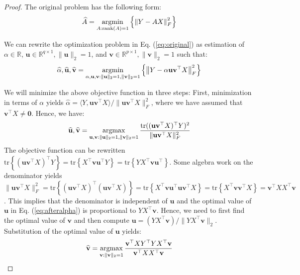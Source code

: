 \begin{proof}

The original problem has the following form:
\begin{equation}
\widehat{A} = \operatorname*{argmin}_{A: \mathrm{rank}(A) = 1} \left\{ \left\| Y - AX\right\|_F^2 \right\}
\label{eq:original}
\end{equation}

We can rewrite the optimization problem in Eq. (\ref{eq:original}) as estimation of $\alpha \in \mathbb{R}$, $\mathbf{u} \in \mathbb{R}^{q\times 1}, \|\mathbf{u}\|_2 =1$, and $\mathbf{v} \in \mathbb{R}^{p\times 1}, \|\mathbf{v}\|_2 = 1$ such that:
\begin{equation}
\widehat{\alpha}, \widehat{\mathbf{u}}, \widehat{\mathbf{v}} = \operatorname*{argmin}_{\alpha, \mathbf{u}, \mathbf{v}: \|\mathbf{u}\|_2 =1, \|\mathbf{v}\|_2 =1} \left\{ \left\| Y - \alpha\mathbf{u}\mathbf{v}^{\top}X\right\|_F^2 \right\}
\end{equation}

We will minimize the above objective function in three steps: First, minimization in terms of $\alpha$ yields $\widehat{\alpha} = \langle Y, \mathbf{u}\mathbf{v}^{\top}X\rangle/\|\mathbf{u}\mathbf{v}^{\top}X\|_F^2$, where we have assumed that $\mathbf{v}^{\top}X \neq \mathbf{0}$. Hence, we have:
\begin{equation}
\widehat{\mathbf{u}}, \widehat{\mathbf{v}} = \operatorname*{argmax}_{\mathbf{u}, \mathbf{v}: \|\mathbf{u}\|_2 =1, \|\mathbf{v}\|_2 =1} \frac{\mathrm{tr}((\mathbf{u}\mathbf{v}^{\top}X)^{\top}Y)^2}{\|\mathbf{u}\mathbf{v}^{\top}X\|_F^2 }
\label{eq:afteralpha}
\end{equation}
The objective function can be rewritten  $\mathrm{tr}\left\{(\mathbf{u}\mathbf{v}^{\top}X)^{\top}Y\right\} = \mathrm{tr}\left\{X^{\top}\mathbf{v}\mathbf{u}^{\top}Y\right\} = \mathrm{tr}\left\{YX^{\top}\mathbf{v}\mathbf{u}^{\top}\right\}$.  
Some algebra work on the denominator yields $\|\mathbf{u}\mathbf{v}^{\top}X\|_F^2 = \mathrm{tr}\left\{(\mathbf{u}\mathbf{v}^{\top}X)^{\top}(\mathbf{u}\mathbf{v}^{\top}X) \right\}  = \mathrm{tr}\left\{ X^{\top}\mathbf{v}\mathbf{u}^{\top}\mathbf{u}\mathbf{v}^{\top}X\right\} = \mathrm{tr}\left\{ X^{\top}\mathbf{v}\mathbf{v}^{\top}X \right\} = \mathbf{v}^{\top}XX^{\top}\mathbf{v}$.  
This implies that the denominator is independent of $\mathbf{u}$ and the optimal value of $\mathbf{u}$ in Eq. (\ref{eq:afteralpha}) is proportional to $YX^{\top}\mathbf{v}$. Hence, we need to first find the optimal value of $\mathbf{v}$ and then compute $\mathbf{u} = (YX^{\top}\mathbf{v})/\|YX^{\top}\mathbf{v}\|_2$. Substitution of the optimal value of $\mathbf{u}$ yields:
\begin{equation}
\widehat{\mathbf{v}} = \operatorname*{argmax}_{\mathbf{v}: \|\mathbf{v}\|_2 =1} \frac{\mathbf{v}^{\top}XY^{\top}YX^{\top}\mathbf{v}}{\mathbf{v}^{\top}XX^{\top}\mathbf{v} }
\label{eq:afterU}
\end{equation}


\end{proof}
